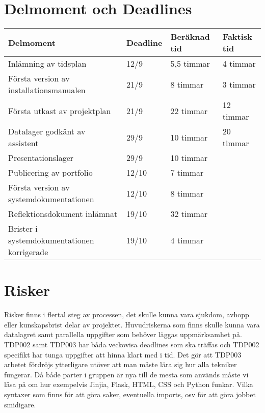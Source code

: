 \documentclass{TDP003mall}
\begin{document}
\section{Delmoment och Deadlines}
\begin{table}[!h]
  \begin{tabular}{|l|l|l|l|}
  \hline
      Delmoment & Deadline & Beräknad tid & Faktisk tid \\ \hline
      Inlämning av tidsplan & 12/9 & 5,5 timmar & 4 timmar \\ \hline
      Första version av installationsmanualen & 21/9 & 8 timmar & 3 timmar \\ \hline
      Första utkast av projektplan & 21/9 & 22 timmar & 12 timmar \\ \hline
      Datalager godkänt av assistent & 29/9 & 10 timmar & 20 timmar \\ \hline
      Presentationslager & 29/9 & 10 timmar & ~ \\ \hline
      Publicering av portfolio & 12/10 & 7 timmar & ~ \\ \hline
      Första version av systemdokumentationen & 12/10 & 8 timmar & ~ \\ \hline
      Reflektionsdokument inlämnat & 19/10 & 32 timmar & ~ \\ \hline
      Brister i systemdokumentationen korrigerade & 19/10 & 4 timmar & ~ \\ \hline
  \end{tabular}
\end{table}

\section{Risker}

Risker finns i flertal steg av processen, det skulle kunna vara sjukdom, avhopp eller kunskapsbrist delar av projektet.
Huvudriskerna som finns skulle kunna vara datalagret samt parallella uppgifter som behöver läggas uppmärksamhet på.
TDP002 samt TDP003 har båda veckovisa deadlines som ska träffas och TDP002 specifikt har tunga uppgifter att hinna klart med i tid.
Det gör att TDP003 arbetet fördröjs ytterligare utöver att man måste lära sig hur alla tekniker fungerar.
Då både parter i gruppen är nya till de mesta som används måste vi läsa på om hur exempelvis Jinjia, Flask, HTML, CSS och Python funkar.
Vilka syntaxer som finns för att göra saker, eventuella imports, osv för att göra jobbet smidigare.
\end{document}
